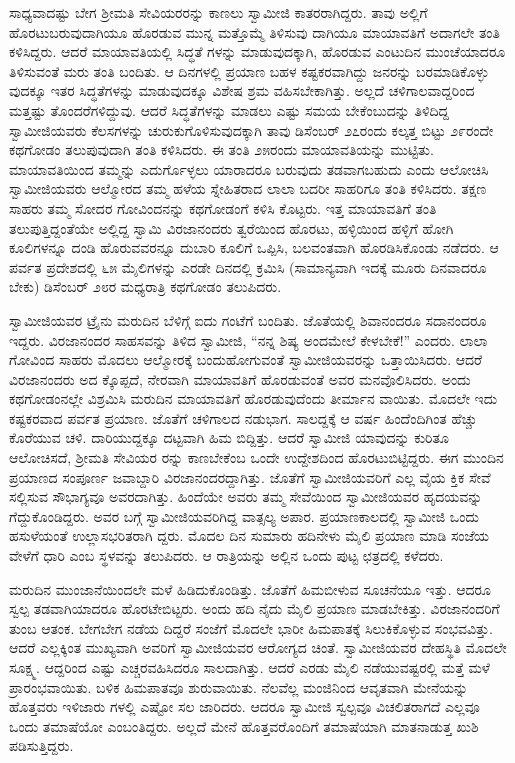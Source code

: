 ಸಾಧ್ಯವಾದಷ್ಟು ಬೇಗ ಶ್ರೀಮತಿ ಸೇವಿಯರರನ್ನು ಕಾಣಲು ಸ್ವಾಮೀಜಿ ಕಾತರರಾಗಿದ್ದರು. ತಾವು ಅಲ್ಲಿಗೆ ಹೊರಟುಬರುವುದಾಗಿಯೂ ಹೊರಡುವ ಮುನ್ನ ಮತ್ತೊಮ್ಮೆ ತಿಳಿಸುವು ದಾಗಿಯೂ ಮಾಯಾವತಿಗೆ ಅದಾಗಲೇ ತಂತಿ ಕಳಿಸಿದ್ದರು. ಆದರೆ ಮಾಯಾವತಿಯಲ್ಲಿ ಸಿದ್ಧತೆ ಗಳನ್ನು ಮಾಡುವುದಕ್ಕಾಗಿ, ಹೊರಡುವ ಎಂಟುದಿನ ಮುಂಚೆಯಾದರೂ ತಿಳಿಸುವಂತೆ ಮರು ತಂತಿ ಬಂದಿತು. ಆ ದಿನಗಳಲ್ಲಿ ಪ್ರಯಾಣ ಬಹಳ ಕಷ್ಟಕರವಾಗಿದ್ದು ಜನರನ್ನು ಬರಮಾಡಿಕೊಳ್ಳು ವುದಕ್ಕೂ ಇತರ ಸಿದ್ಧತೆಗಳನ್ನು ಮಾಡುವುದಕ್ಕೂ ವಿಶೇಷ ಶ್ರಮ ವಹಿಸಬೇಕಾಗಿತ್ತು. ಅಲ್ಲದೆ ಚಳಿಗಾಲವಾದ್ದರಿಂದ ಮತ್ತಷ್ಟು ತೊಂದರೆಗಳಿದ್ದುವು. ಆದರೆ ಸಿದ್ಧತೆಗಳನ್ನು ಮಾಡಲು ಎಷ್ಟು ಸಮಯ ಬೇಕೆಂಬುದನ್ನು ತಿಳಿದಿದ್ದ ಸ್ವಾಮೀಜಿಯವರು ಕೆಲಸಗಳನ್ನು ಚುರುಕುಗೊಳಿಸುವುದಕ್ಕಾಗಿ ತಾವು ಡಿಸೆಂಬರ್ ೨೭ರಂದು ಕಲ್ಕತ್ತ ಬಿಟ್ಟು ೨೯ರಂದೇ ಕಥಗೋಡಂ ತಲುಪುವುದಾಗಿ ತಂತಿ ಕಳಿಸಿದರು. ಈ ತಂತಿ ೨೫ರಂದು ಮಾಯಾವತಿಯನ್ನು ಮುಟ್ಟಿತು. ಮಾಯಾವತಿಯಿಂದ ತಮ್ಮನ್ನು ಎದುರ್ಗೊಳ್ಳಲು ಯಾರಾದರೂ ಬರುವುದು ತಡವಾಗಬಹುದು ಎಂದು ಆಲೋಚಿಸಿ ಸ್ವಾಮೀಜಿಯವರು ಆಲ್ಮೋರದ ತಮ್ಮ ಹಳೆಯ ಸ್ನೇಹಿತರಾದ ಲಾಲಾ ಬದರೀ ಸಾಹರಿಗೂ ತಂತಿ ಕಳಿಸಿದರು. ತಕ್ಷಣ ಸಾಹರು ತಮ್ಮ ಸೋದರ ಗೋವಿಂದನನ್ನು ಕಥಗೋಡಂಗೆ ಕಳಿಸಿ ಕೊಟ್ಟರು. ಇತ್ತ ಮಾಯಾವತಿಗೆ ತಂತಿ ತಲುಪುತ್ತಿದ್ದಂತೆಯೇ ಅಲ್ಲಿದ್ದ ಸ್ವಾಮಿ ವಿರಜಾನಂದರು ತ್ವರೆಯಿಂದ ಹೊರಟು, ಹಳ್ಳಿಯಿಂದ ಹಳ್ಳಿಗೆ ಹೋಗಿ ಕೂಲಿಗಳನ್ನೂ ದಂಡಿ ಹೊರುವವರನ್ನೂ ದುಬಾರಿ ಕೂಲಿಗೆ ಒಪ್ಪಿಸಿ, ಬಲವಂತವಾಗಿ ಹೊರಡಿಸಿಕೊಂಡು ನಡೆದರು. ಆ ಪರ್ವತ ಪ್ರದೇಶದಲ್ಲಿ ೬೫ ಮೈಲಿಗಳನ್ನು ಎರಡೇ ದಿನದಲ್ಲಿ ಕ್ರಮಿಸಿ (ಸಾಮಾನ್ಯವಾಗಿ ಇದಕ್ಕೆ ಮೂರು ದಿನವಾದರೂ ಬೇಕು) ಡಿಸೆಂಬರ್ ೨೮ರ ಮಧ್ಯರಾತ್ರಿ ಕಥಗೋಡಂ ತಲುಪಿದರು.

ಸ್ವಾಮೀಜಿಯವರ ಟ್ರೈನು ಮರುದಿನ ಬೆಳಿಗ್ಗೆ ಐದು ಗಂಟೆಗೆ ಬಂದಿತು. ಜೊತೆಯಲ್ಲಿ ಶಿವಾನಂದರೂ ಸದಾನಂದರೂ ಇದ್ದರು. ವಿರಜಾನಂದರ ಸಾಹಸವನ್ನು ತಿಳಿದ ಸ್ವಾಮೀಜಿ, “ನನ್ನ ಶಿಷ್ಯ ಅಂದಮೇಲೆ ಕೇಳಬೇಕೆ!” ಎಂದರು. ಲಾಲಾ ಗೋವಿಂದ ಸಾಹರು ಮೊದಲು ಆಲ್ಮೋರಕ್ಕೆ ಬಂದುಹೋಗುವಂತೆ ಸ್ವಾಮೀಜಿಯವರನ್ನು ಒತ್ತಾಯಿಸಿದರು. ಆದರೆ ವಿರಜಾನಂದರು ಅದ ಕ್ಕೊಪ್ಪದೆ, ನೇರವಾಗಿ ಮಾಯಾವತಿಗೆ ಹೊರಡುವಂತೆ ಅವರ ಮನವೊಲಿಸಿದರು. ಅಂದು ಕಥಗೋಡಂನಲ್ಲೇ ವಿಶ್ರಮಿಸಿ ಮರುದಿನ ಮಾಯಾವತಿಗೆ ಹೊರಡುವುದೆಂದು ತೀರ್ಮಾನ ವಾಯಿತು. ಮೊದಲೇ ಇದು ಕಷ್ಟಕರವಾದ ಪರ್ವತ ಪ್ರಯಾಣ. ಜೊತೆಗೆ ಚಳಿಗಾಲದ ನಡುಭಾಗ. ಸಾಲದ್ದಕ್ಕೆ ಆ ವರ್ಷ ಹಿಂದೆಂದಿಗಿಂತ ಹೆಚ್ಚು ಕೊರೆಯುವ ಚಳಿ. ದಾರಿಯುದ್ದಕ್ಕೂ ದಟ್ಟವಾಗಿ ಹಿಮ ಬಿದ್ದಿತ್ತು. ಆದರೆ ಸ್ವಾಮೀಜಿ ಯಾವುದನ್ನು ಕುರಿತೂ ಆಲೋಚಿಸದೆ, ಶ್ರೀಮತಿ ಸೇವಿಯರ ರನ್ನು ಕಾಣಬೇಕೆಂಬ ಒಂದೇ ಉದ್ದೇಶದಿಂದ ಹೊರಟುಬಿಟ್ಟಿದ್ದರು. ಈಗ ಮುಂದಿನ ಪ್ರಯಾಣದ ಸಂಪೂರ್ಣ ಜವಾಬ್ದಾರಿ ವಿರಜಾನಂದರದ್ದಾಗಿತ್ತು. ಜೊತೆಗೆ ಸ್ವಾಮೀಜಿಯವರಿಗೆ ಎಲ್ಲ ವೈಯ ಕ್ತಿಕ ಸೇವೆ ಸಲ್ಲಿಸುವ ಸೌಭಾಗ್ಯವೂ ಅವರದಾಗಿತ್ತು. ಹಿಂದೆಯೇ ಅವರು ತಮ್ಮ ಸೇವೆಯಿಂದ ಸ್ವಾಮೀಜಿಯವರ ಹೃದಯವನ್ನು ಗೆದ್ದುಕೊಂಡಿದ್ದರು. ಅವರ ಬಗ್ಗೆ ಸ್ವಾಮೀಜಿಯವರಿಗಿದ್ದ ವಾತ್ಸಲ್ಯ ಅಪಾರ. ಪ್ರಯಾಣಕಾಲದಲ್ಲಿ ಸ್ವಾಮೀಜಿ ಒಂದು ಹಸುಳೆಯಂತೆ ಉಲ್ಲಾಸಭರಿತರಾಗಿ ದ್ದರು. ಮೊದಲ ದಿನ ಸುಮಾರು ಹದಿನೇಳು ಮೈಲಿ ಪ್ರಯಾಣ ಮಾಡಿ ಸಂಜೆಯ ವೇಳೆಗೆ ಧಾರಿ ಎಂಬ ಸ್ಥಳವನ್ನು ತಲುಪಿದರು. ಆ ರಾತ್ರಿಯನ್ನು ಅಲ್ಲಿನ ಒಂದು ಪುಟ್ಟ ಛತ್ರದಲ್ಲಿ ಕಳೆದರು.

ಮರುದಿನ ಮುಂಜಾನೆಯಿಂದಲೇ ಮಳೆ ಹಿಡಿದುಕೊಂಡಿತ್ತು. ಜೊತೆಗೆ ಹಿಮಬೀಳುವ ಸೂಚನೆಯೂ ಇತ್ತು. ಆದರೂ ಸ್ವಲ್ಪ ತಡವಾಗಿಯಾದರೂ ಹೊರಟೇಬಿಟ್ಟರು. ಅಂದು ಹದಿ ನೈದು ಮೈಲಿ ಪ್ರಯಾಣ ಮಾಡಬೇಕಿತ್ತು. ವಿರಜಾನಂದರಿಗೆ ತುಂಬ ಆತಂಕ. ಬೇಗಬೇಗ ನಡೆಯ ದಿದ್ದರೆ ಸಂಜೆಗೆ ಮೊದಲೇ ಭಾರೀ ಹಿಮಪಾತಕ್ಕೆ ಸಿಲುಕಿಕೊಳ್ಳುವ ಸಂಭವವಿತ್ತು. ಆದರೆ ಎಲ್ಲಕ್ಕಿಂತ ಮುಖ್ಯವಾಗಿ ಅವರಿಗೆ ಸ್ವಾಮೀಜಿಯವರ ಆರೋಗ್ಯದ ಚಿಂತೆ. ಸ್ವಾಮೀಜಿಯವರ ದೇಹಸ್ಥಿತಿ ಮೊದಲೇ ಸೂಕ್ಷ್ಮ. ಆದ್ದರಿಂದ ಎಷ್ಟು ಎಚ್ಚರವಹಿಸಿದರೂ ಸಾಲದಾಗಿತ್ತು. ಆದರೆ ಎರಡು ಮೈಲಿ ನಡೆಯುವಷ್ಟರಲ್ಲಿ ಮತ್ತೆ ಮಳೆ ಪ್ರಾರಂಭವಾಯಿತು. ಬಳಿಕ ಹಿಮಪಾತವೂ ಶುರುವಾಯಿತು. ನೆಲವೆಲ್ಲ ಮಂಜಿನಿಂದ ಆವೃತವಾಗಿ ಮೇನೆಯನ್ನು ಹೊತ್ತವರು ಇಳಿಜಾರು ಗಳಲ್ಲಿ ಎಷ್ಟೋ ಸಲ ಜಾರಿದರು. ಆದರೂ ಸ್ವಾಮೀಜಿ ಸ್ವಲ್ಪವೂ ವಿಚಲಿತರಾಗದೆ ಎಲ್ಲವೂ ಒಂದು ತಮಾಷೆಯೋ ಎಂಬಂತಿದ್ದರು. ಅಲ್ಲದೆ ಮೇನೆ ಹೊತ್ತವರೊಂದಿಗೆ ತಮಾಷೆಯಾಗಿ ಮಾತನಾಡುತ್ತ ಖುಶಿ ಪಡಿಸುತ್ತಿದ್ದರು.

